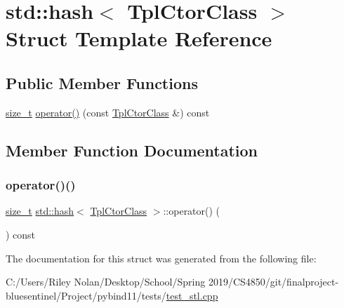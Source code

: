 \hypertarget{structstd_1_1hash_3_01_tpl_ctor_class_01_4}{}\section{std\+::hash$<$ Tpl\+Ctor\+Class $>$ Struct Template Reference}
\label{structstd_1_1hash_3_01_tpl_ctor_class_01_4}
\subsection*{Public Member Functions}
\begin{DoxyCompactItemize}
\item 
\mbox{\hyperlink{detail_2common_8h_a801d6a451a01953ef8cbae6feb6a3638}{size\+\_\+t}} \mbox{\hyperlink{structstd_1_1hash_3_01_tpl_ctor_class_01_4_ab5e56c4397bbf2f22a6e658936f98e42}{operator()}} (const \mbox{\hyperlink{struct_tpl_ctor_class}{Tpl\+Ctor\+Class}} \&) const
\end{DoxyCompactItemize}


\subsection{Member Function Documentation}
\mbox{\label{structstd_1_1hash_3_01_tpl_ctor_class_01_4_ab5e56c4397bbf2f22a6e658936f98e42}} 
\subsubsection{\texorpdfstring{operator()()}{operator()()}}
{\footnotesize\ttfamily \mbox{\hyperlink{detail_2common_8h_a801d6a451a01953ef8cbae6feb6a3638}{size\+\_\+t}} \mbox{\hyperlink{group__python__builtins_ga117a7eab72791313448c40a2f25f3582}{std\+::hash}}$<$ \mbox{\hyperlink{struct_tpl_ctor_class}{Tpl\+Ctor\+Class}} $>$\+::operator() (\begin{DoxyParamCaption}\item[{const \mbox{\hyperlink{struct_tpl_ctor_class}{Tpl\+Ctor\+Class}} \&}]{ }\end{DoxyParamCaption}) const\hspace{0.3cm}{\ttfamily [inline]}}



The documentation for this struct was generated from the following file\+:\begin{DoxyCompactItemize}
\item 
C\+:/\+Users/\+Riley Nolan/\+Desktop/\+School/\+Spring 2019/\+C\+S4850/git/finalproject-\/bluesentinel/\+Project/pybind11/tests/\mbox{\hyperlink{test__stl_8cpp}{test\+\_\+stl.\+cpp}}\end{DoxyCompactItemize}
